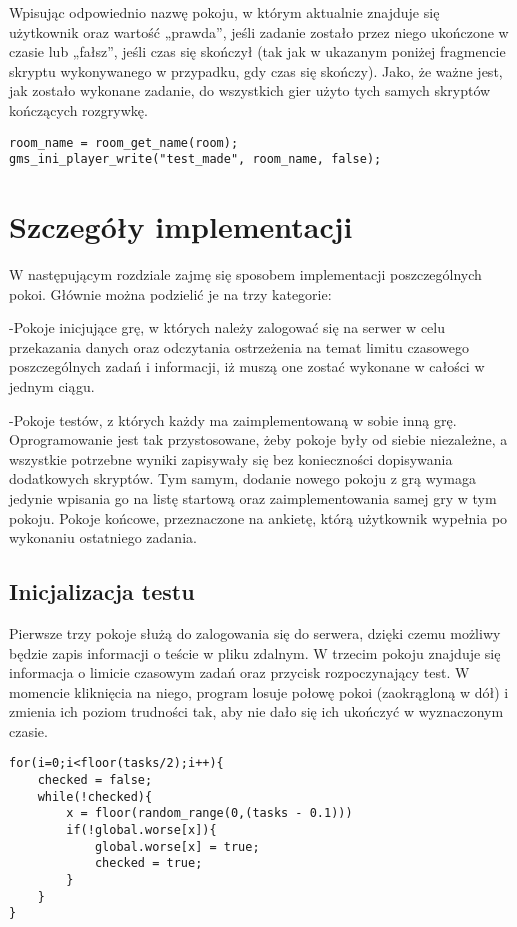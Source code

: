 \documentclass[openright]{xmgr}
\begin{document}
 Wpisując odpowiednio
nazwę pokoju, w którym aktualnie znajduje się użytkownik oraz wartość „prawda”, jeśli zadanie zostało przez niego ukończone w czasie lub „fałsz”, jeśli czas się skończył (tak jak w ukazanym poniżej fragmencie skryptu wykonywanego w przypadku, gdy czas się skończy). Jako, że ważne jest, jak zostało wykonane zadanie, do wszystkich gier użyto tych samych skryptów kończących rozgrywkę.

\begin{lstlisting}[caption={Fragment skryptu w przypadku końca czasu}]
room_name = room_get_name(room);
gms_ini_player_write("test_made", room_name, false);
\end{lstlisting}

\chapter{Szczegóły implementacji}
W następującym rozdziale zajmę się sposobem implementacji poszczególnych
pokoi. Głównie można podzielić je na trzy kategorie:

-Pokoje inicjujące grę, w których należy zalogować się na serwer w celu przekazania danych oraz odczytania ostrzeżenia na temat limitu czasowego poszczególnych zadań i informacji, iż muszą one zostać wykonane w całości w jednym ciągu. 

-Pokoje testów, z których każdy ma zaimplementowaną w sobie inną grę. Oprogramowanie jest tak przystosowane, żeby pokoje były od siebie niezależne, a wszystkie potrzebne wyniki zapisywały się bez konieczności dopisywania dodatkowych skryptów. Tym samym, dodanie nowego pokoju z grą wymaga jedynie wpisania go na listę startową oraz zaimplementowania samej gry w tym pokoju.
Pokoje końcowe, przeznaczone na ankietę, którą użytkownik wypełnia po wykonaniu ostatniego zadania.


\section{Inicjalizacja testu}
Pierwsze trzy pokoje służą do zalogowania się do serwera, dzięki czemu możliwy
będzie zapis informacji o teście w pliku zdalnym. W trzecim pokoju znajduje się informacja o limicie czasowym zadań oraz przycisk rozpoczynający test. W momencie kliknięcia na niego, program losuje połowę pokoi (zaokrągloną w dół) i zmienia ich poziom trudności tak, aby nie dało się ich ukończyć w wyznaczonym czasie. 

\begin{lstlisting}[caption={Fragment skryptu scr\_make\_times}]
for(i=0;i<floor(tasks/2);i++){
    checked = false;
    while(!checked){
        x = floor(random_range(0,(tasks - 0.1)))
        if(!global.worse[x]){
            global.worse[x] = true;
            checked = true;
        }
    }
}
\end{lstlisting}
\end{document}
